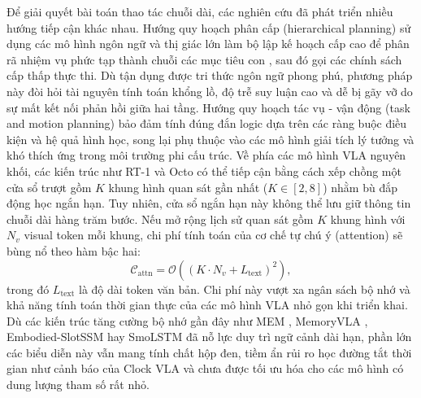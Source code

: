 Để giải quyết bài toán thao tác chuỗi dài, các nghiên cứu đã phát triển nhiều hướng tiếp cận khác nhau. Hướng quy hoạch phân cấp (hierarchical planning) sử dụng các mô hình ngôn ngữ và thị giác lớn làm bộ lập kế hoạch cấp cao để phân rã nhiệm vụ phức tạp thành chuỗi các mục tiêu con \cite{saycan2022,innermonologue2022,codeaspolicies2023,voxposer2023}, sau đó gọi các chính sách cấp thấp thực thi. Dù tận dụng được tri thức ngôn ngữ phong phú, phương pháp này đòi hỏi tài nguyên tính toán khổng lồ, độ trễ suy luận cao và dễ bị gãy vỡ do sự mất kết nối phản hồi giữa hai tầng. Hướng quy hoạch tác vụ - vận động (task and motion planning) \cite{garrett2021tamp} bảo đảm tính đúng đắn logic dựa trên các ràng buộc điều kiện và hệ quả hình học, song lại phụ thuộc vào các mô hình giải tích lý tưởng và khó thích ứng trong môi trường phi cấu trúc. Về phía các mô hình VLA nguyên khối, các kiến trúc như RT-1 \cite{rt12022} và Octo \cite{octo2024} có thể tiếp cận bằng cách xếp chồng một cửa sổ trượt gồm $K$ khung hình quan sát gần nhất ($K \in [2, 8]$) nhằm bù đắp động học ngắn hạn. Tuy nhiên, cửa sổ ngắn hạn này không thể lưu giữ thông tin chuỗi dài hàng trăm bước. Nếu mở rộng lịch sử quan sát gồm $K$ khung hình với $N_v$ visual token mỗi khung, chi phí tính toán của cơ chế tự chú ý (attention) sẽ bùng nổ theo hàm bậc hai:
\begin{equation}
\mathcal{C}_{\mathrm{attn}} = \mathcal{O}\left((K \cdot N_v + L_{\mathrm{text}})^2\right),
\label{eq:quadratic-attention}
\end{equation}
trong đó $L_{\mathrm{text}}$ là độ dài token văn bản. Chi phí này vượt xa ngân sách bộ nhớ và khả năng tính toán thời gian thực của các mô hình VLA nhỏ gọn khi triển khai. Dù các kiến trúc tăng cường bộ nhớ gần đây như MEM \cite{mem2026}, MemoryVLA \cite{memoryvla2026}, Embodied-SlotSSM \cite{liberomem2025} hay SmoLSTM \cite{smoLSTM2026} đã nỗ lực duy trì ngữ cảnh dài hạn, phần lớn các biểu diễn này vẫn mang tính chất hộp đen, tiềm ẩn rủi ro học đường tắt thời gian như cảnh báo của Clock VLA \cite{clockvla2026} và chưa được tối ưu hóa cho các mô hình có dung lượng tham số rất nhỏ.

